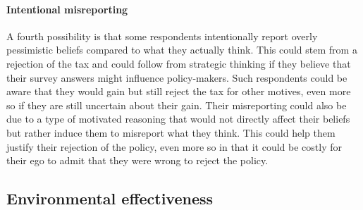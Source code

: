 \documentclass[12pt]{article} %
\begin{document}
\paragraph{Intentional misreporting}

A fourth possibility is that some respondents intentionally report overly pessimistic beliefs compared to what they actually think. This could stem from a rejection of the tax and could follow from strategic thinking if they believe that their survey answers might influence policy-makers. Such respondents could be aware that they would gain but still reject the tax for other motives, even more so if they are still uncertain about their gain. Their misreporting could also be due to a type of motivated reasoning that would not directly affect their beliefs but rather induce them to misreport what they think. This could help them justify their rejection of the policy, even more so in that it could be costly for their ego to admit that they were wrong to reject the policy.




\subsection{Environmental effectiveness}\label{subsec:update_ee}

\end{document}
